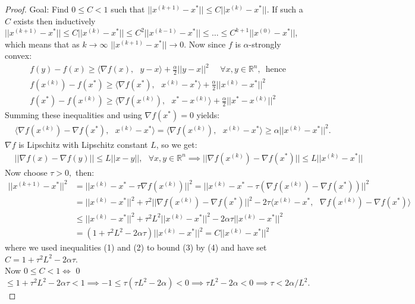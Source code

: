 \begin{proof}
Goal: Find $0\leq C < 1$ such that $||x^{(k+1)} - x^{*}|| \leq C||x^{(k)} - x^{*}||.$ If such a $C$ exists then inductively $||x^{(k+1)} - x^{*}|| \leq C||x^{(k)} - x^{*}|| \leq C^{2}||x^{(k-1)} - x^{*}|| \leq \ldots \leq C^{k+1}||x^{(0)} - x^{*}||$, which means that as $k\rightarrow \infty$ $||x^{(k+1)} - x^{*}|| \rightarrow 0.$ Now since $f$ is $\alpha$-strongly convex:
\begin{align}
    &f(y) - f(x) \geq \langle \nabla f(x),\text{ } y-x\rangle + \frac{\alpha}{2}||y-x||^{2} \text{ }\text{ } \forall x,y \in \mathbb{R}^{n}\text{,} \text{ } \text{hence} \nonumber\\
    &f(x^{(k)}) - f(x^{*}) \geq \langle \nabla f(x^{*}),\text{ } x^{(k)}-x^{*}\rangle + \frac{\alpha}{2}||x^{(k)}-x^{*}||^{2}\nonumber\\
    &f(x^{*}) - f(x^{(k)}) \geq \langle \nabla f(x^{(k)}),\text{ } x^{*}-x^{(k)}\rangle + \frac{\alpha}{2}||x^{*}-x^{(k)}||^{2}\nonumber
\end{align}
Summing these inequalities and using $\nabla f(x^{*}) = 0$ yields:
\begin{align}
    &\langle \nabla f(x^{(k)}) - \nabla f(x^{*}),\text{ } x^{(k)} - x^{*}\rangle = \langle \nabla f(x^{(k)}),\text{ } x^{(k)} - x^{*}\rangle \geq \alpha ||x^{(k)} - x^{*}||^{2}.
\end{align}
$\nabla f$ is Lipschitz with Lipschitz constant $L$, so we get:
\begin{align}
    &||\nabla f(x) - \nabla f(y)|| \leq L||x-y||,\text{ } \forall x, y \in \mathbb{R}^{n} \implies ||\nabla f(x^{(k)}) - \nabla f(x^{*})|| \leq L||x^{(k)}-x^{*}||
\end{align}
Now choose $\tau > 0,$ then:
\begin{align}
||x^{(k+1)}-x^{*}||^{2}
    &= ||x^{(k)}-x^{*}-\tau \nabla f(x^{(k)})||^{2} = ||x^{(k)}-x^{*}-\tau (\nabla f(x^{(k)})-\nabla f(x^{*}))||^{2}\nonumber\\
    &= ||x^{(k)}-x^{*}||^{2} + \tau^{2}||\nabla f(x^{(k)})-\nabla f(x^{*})||^{2} - 2\tau \langle x^{(k)}-x^{*},\text{ } \nabla f(x^{(k)})-\nabla f(x^{*})\rangle\\
    &\leq ||x^{(k)}-x^{*}||^{2} + \tau^{2}L^{2}||x^{(k)}-x^{*}||^{2} - 2\alpha \tau||x^{(k)}-x^{*}||^{2}\nonumber\\
    &= \left(1+\tau^{2}L^{2}-2\alpha \tau \right)||x^{(k)}-x^{*}||^{2} = C||x^{(k)}-x^{*}||^{2}
\end{align}
where we used inequalities (1) and (2) to bound (3) by (4) and have set $C = 1+\tau^{2}L^{2}-2\alpha \tau.$\\ Now $0\leq C<1 \iff$ 0 $\leq 1+\tau^{2}L^{2}-2\alpha \tau < 1 \implies -1 \leq \tau\left(\tau L^{2}-2\alpha \right) < 0 \implies \tau L^{2}-2\alpha < 0 \implies \tau < 2\alpha/L^{2}.$ 
\end{proof}
